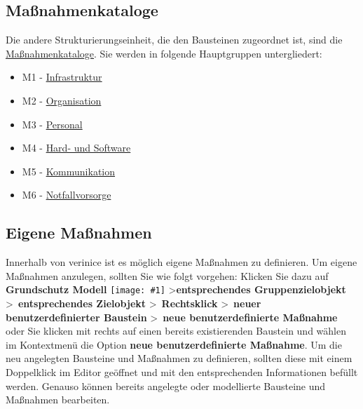 \documentclass[a4paper,10pt]{book}
\newcommand{\icon}[1]{\texttt{[image: \#1]}}
\begin{document}
\subsection{Maßnahmenkataloge}
Die andere Strukturierungseinheit, die den Bausteinen zugeordnet ist, sind die \href{https://www.bsi.bund.de/cln_156/DE/Themen/weitereThemen/ITGrundschutzKataloge/Inhalt/Massnahmenkataloge/massnahmenkataloge_node.html}{Maßnahmenkataloge}. Sie werden in folgende Hauptgruppen untergliedert:
\begin{itemize}
\item M1 - \href{https://www.bsi.bund.de/cln_156/DE/Themen/weitereThemen/ITGrundschutzKataloge/Inhalt/Massnahmenkataloge/M1Infrastruktur/m1infrastruktur_node.html}{Infrastruktur}
\item M2 - \href{https://www.bsi.bund.de/cln_156/DE/Themen/weitereThemen/ITGrundschutzKataloge/Inhalt/Massnahmenkataloge/M2Organisation/m2organisation_node.html}{Organisation}
\item M3 - \href{https://www.bsi.bund.de/cln_156/DE/Themen/weitereThemen/ITGrundschutzKataloge/Inhalt/Massnahmenkataloge/M3Personal/m3personal_node.html}{Personal}
\item M4 - \href{https://www.bsi.bund.de/cln_156/DE/Themen/weitereThemen/ITGrundschutzKataloge/Inhalt/Massnahmenkataloge/M4HardwareundSoftware/m4hardwareundsoftware_node.html}{Hard- und Software}
\item M5 - \href{https://www.bsi.bund.de/cln_156/DE/Themen/weitereThemen/ITGrundschutzKataloge/Inhalt/Massnahmenkataloge/M5Kommunikation/m5kommunikation_node.html}{Kommunikation}
\item M6 - \href{https://www.bsi.bund.de/cln_156/DE/Themen/weitereThemen/ITGrundschutzKataloge/Inhalt/Massnahmenkataloge/M6Notfallversorgung/m6notfallvorsorge_node.html}{Notfallvorsorge}
\end{itemize}

\subsection{Eigene Maßnahmen}
Innerhalb von verinice ist es möglich eigene Maßnahmen zu definieren. Um eigene Maßnahmen anzulegen, sollten Sie wie folgt vorgehen:
Klicken Sie dazu auf \textbf{Grundschutz Modell} \icon{Icon/GS_Modell.png} \textgreater \textbf{entsprechendes Gruppenzielobjekt}
\textgreater\ \textbf{entsprechendes Zielobjekt} \textgreater\ \textbf{Rechtsklick} \textgreater\ \textbf{neuer benutzerdefinierter Baustein} \textgreater\
\textbf{neue benutzerdefinierte Maßnahme} oder Sie klicken mit rechts auf einen bereits existierenden Baustein und wählen im Kontextmenü
die Option \textbf{neue benutzerdefinierte Maßnahme}.
Um die neu angelegten Bausteine und Maßnahmen zu definieren, sollten diese mit einem Doppelklick im Editor geöffnet und mit den entsprechenden
Informationen befüllt werden. Genauso können bereits angelegte oder modellierte Bausteine und Maßnahmen bearbeiten.
\end{document}

